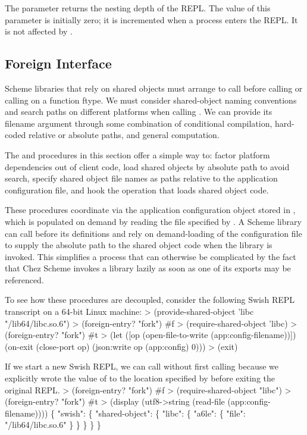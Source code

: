 The  parameter returns the nesting depth of the
 REPL.
The value of this parameter is initially zero; it is incremented when a
process enters the  REPL.
It is not affected by .

\subsection{Foreign Interface}

Scheme libraries that rely on shared objects must arrange
to call  before calling  or
calling  on a function ftype.
We must consider shared-object naming conventions and search paths on
different platforms when calling .
We can provide its filename argument through some combination of conditional
compilation, hard-coded relative or absolute paths, and general computation.

The  and  procedures
in this section offer a simple way to:
factor platform dependencies out of client code,
load shared objects by absolute path to avoid search,
specify shared object file names as paths relative
to the application configuration file, and
hook the operation that loads shared object code.

These procedures coordinate via the application configuration object stored in
, which is populated on demand by reading the file specified
by .
A Scheme library can call  before its
 definitions and rely on demand-loading of the
configuration file to supply the absolute path to the shared object code when
the library is invoked.
This simplifies a process that can otherwise be complicated
by the fact that Chez Scheme invokes a library lazily as soon as
one of its exports may be referenced.

To see how these procedures are decoupled, consider the following Swish REPL
transcript on a 64-bit Linux machine:
\codebegin
> (provide-shared-object 'libc "/lib64/libc.so.6")
> (foreign-entry? "fork")
#f
> (require-shared-object 'libc)
> (foreign-entry? "fork")
#t
> (let ([op (open-file-to-write (app:config-filename))])
    (on-exit (close-port op)
      (json:write op (app:config) 0)))
> (exit)
\codeend

If we start a new Swish REPL, we can call 
without first calling 
because we explicitly wrote the value of  to the location
specified by  before exiting the original REPL.
\codebegin
> (foreign-entry? "fork")
#f
> (require-shared-object "libc")
> (foreign-entry? "fork")
#t
> (display (utf8->string (read-file (app:config-filename))))
\{
  "swish": \{
    "shared-object": \{
      "libc": \{
        "a6le": \{
          "file": "/lib64/libc.so.6"
        \}
      \}
    \}
  \}
\}
\codeend

